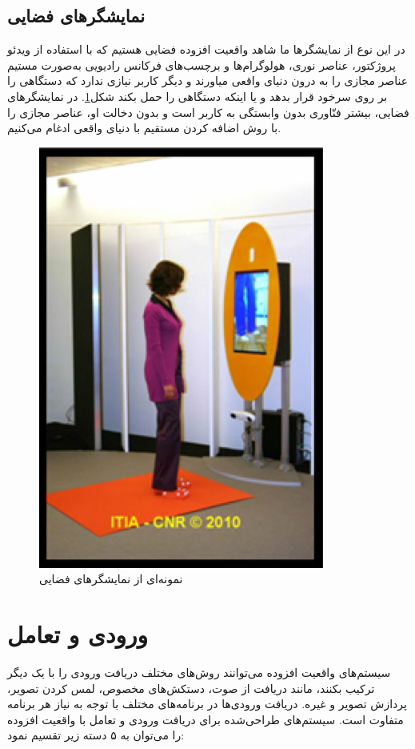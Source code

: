 \subsection{نمایشگرهای فضایی}
در این نوع از نمایشگرها ما شاهد واقعیت افزوده فضایی هستیم که با استفاده از ویدئو پروژکتور، عناصر نوری، هولوگرام‌ها و برچسب‌های فرکانس رادیویی به‌صورت مستیم عناصر مجازی را به درون دنیای واقعی میاورند و دیگر کاربر نیازی ندارد که دستگاهی را بر روی سرخود قرار بدهد و یا اینکه دستگاهی را حمل بکند شکل\ref{fig:sar}. در نمایشگرهای فضایی، بیشتر فنّاوری بدون وابستگی به کاربر است و بدون دخالت او، عناصر مجازی را با روش اضافه کردن مستقیم با دنیای واقعی ادغام می‌کنیم\cite{Bimber}.
\begin{figure}[tb]
	\centering
	\includegraphics[width=0.6\linewidth]{image/sar}
	\caption {نمونه‌ای از نمایشگرهای فضایی\cite{Bimber}}
	\label{fig:sar}
\end{figure}
\section{ورودی و تعامل}
سیستم‌های واقعیت افزوده می‌توانند روش‌های مختلف دریافت ورودی را با یک دیگر ترکیب بکنند، مانند دریافت از صوت، دستکش‌های مخصوص، لمس کردن تصویر، پردازش تصویر و غیره. دریافت ورودی‌ها در برنامه‌های مختلف با توجه به نیاز هر برنامه متفاوت است.
سیستم‌های طراحی‌شده برای دریافت ورودی و تعامل با واقعیت افزوده را می‌توان به ۵ دسته زیر تقسیم نمود:

